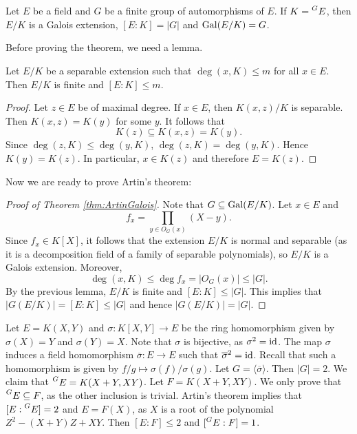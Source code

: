 \chapter{}



\begin{theorem}[Artin]
\label{thm:ArtinGalois}
    Let $E$ be a field and $G$ be a finite group of automorphisms of $E$. 
    If $K=\prescript{G}{}{E}$, then $E/K$ is a Galois extension,
    $[E:K]=|G|$ and $\operatorname{Gal}(E/K)=G$. 
\end{theorem}

Before proving the theorem, we need a lemma.

\begin{lemma}
    Let $E/K$ be a separable extension such that $\deg(x,K)\leq m$
    for all $x\in E$. Then $E/K$ is finite and $[E:K]\leq m$. 
\end{lemma}

\begin{proof}
   Let $z\in E$ be of maximal degree. If $x\in E$, 
   then $K(x,z)/K$ is separable. Then $K(x,z)=K(y)$ for some $y$. 
   It follows that 
   \[
   K(z)\subseteq K(x,z)=K(y).
   \]
   Since 
   $\deg(z,K)\leq\deg(y,K)$, 
   $\deg(z,K)=\deg(y,K)$. Hence 
   $K(y)=K(z)$. In particular, $x\in K(z)$ and
   therefore $E=K(z)$. 
\end{proof}

Now we are ready to prove Artin's theorem: 

\begin{proof}[Proof of Theorem \ref{thm:ArtinGalois}]
    Note that $G\subseteq\operatorname{Gal}(E/K)$. Let $x\in E$ and 
    \[
    f_x=\prod_{y\in O_G(x)}(X-y).
    \]
    Since $f_x\in K[X]$, it follows
    that the extension $E/K$ is normal and separable (as it is a decomposition
    field of a family of separable polynomials), so $E/K$ is a Galois extension. Moreover, 
    \[
    \deg(x,K)\leq \deg f_x=|O_G(x)|\leq |G|.
    \]
    By the previous lemma, $E/K$ is finite and $[E:K]\leq |G|$. This
    implies that
    $|G(E/K)|=[E:K]\leq |G|$ and hence $|G(E/K)|=|G|$. 
\end{proof}

\begin{example}
    Let $E=K(X,Y)$ and $\sigma\colon K[X,Y]\to E$ be the ring homomorphism given by $\sigma(X)=Y$ and $\sigma(Y)=X$. Note that $\sigma$ is bijective, as $\sigma^2=\operatorname{id}$. The map $\sigma$ induces
    a field homomorphism $\overline{\sigma}\colon E\to E$ such that 
    $\overline{\sigma}^2=\operatorname{id}$. Recall that such a homomorphism is given by 
    $f/g\mapsto \sigma(f)/\sigma(g)$. Let $G=\langle\overline{\sigma}\rangle$. Then $|G|=2$. 
    We claim that $\prescript{G}{}{E}=K(X+Y,XY)$. Let $F=K(X+Y,XY)$. We only prove
    that $\prescript{G}{}{E}\subseteq F$, as the other inclusion is trivial. Artin's theorem
    implies that $[E:\prescript{G}{}{E}]=2$ and $E=F(X)$, as $X$ is a root
    of the polynomial $Z^2-(X+Y)Z+XY$. Then $[E:F]\leq 2$ and $[\prescript{G}{}{E}:F]=1$.
\end{example}

